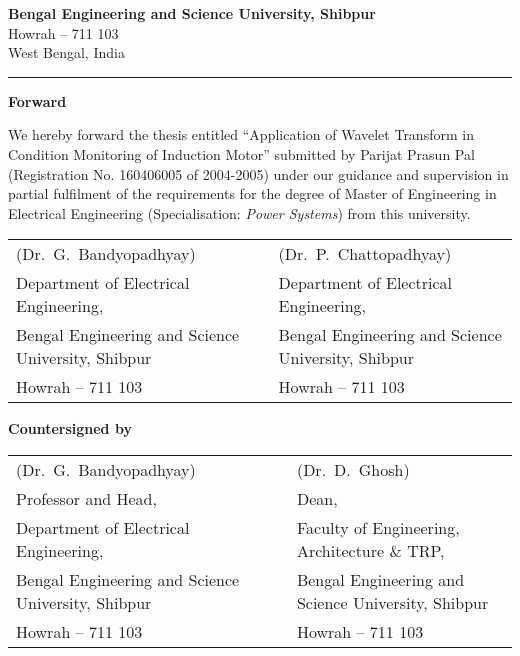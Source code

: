 \documentclass[a4paper,11pt]{report}
\begin{document}

\thispagestyle{empty}
\vspace*{7mm}
\begin{center}
{\Large \textbf{Bengal Engineering and Science University, Shibpur}}\\
\vspace{3.5pt}
{\large Howrah -- 711 103}\\
\vspace{3.5pt}
{\large West Bengal, India}
\end{center}
\hrule

\vspace{25mm}
\begin{center}
{\Large \textbf{Forward}}
\end{center}

\noindent We hereby forward the thesis entitled ``Application of Wavelet Transform in Condition Monitoring of Induction Motor'' submitted by Parijat Prasun Pal (Registration No. 160406005 of 2004-2005) under our guidance and supervision in partial fulfilment of the requirements for the degree of Master of Engineering in Electrical Engineering (Specialisation: \emph{Power Systems}) from this university.

\vspace{25mm}
\begin{flushleft}
\begin{tabular}{@{} lcl @{}}
(Dr.~G.~Bandyopadhyay) & & (Dr.~P.~Chattopadhyay)\\
{\footnotesize Department of Electrical Engineering,} & & {\footnotesize Department of Electrical Engineering,}\\
{\footnotesize Bengal Engineering and Science University, Shibpur} & & {\footnotesize Bengal Engineering and Science University, Shibpur}\\
{\footnotesize Howrah -- 711 103} & & {\footnotesize Howrah -- 711 103}
\end{tabular}

\vspace{20mm}
\noindent \textbf{Countersigned by}

\vspace{25mm}
\begin{tabular}{@{} lcl @{}}
(Dr.~G.~Bandyopadhyay)& & (Dr.~D.~Ghosh)\\
{\footnotesize Professor and Head,}& & {\footnotesize Dean,}\\
{\footnotesize Department of Electrical Engineering,}& &{\footnotesize Faculty of Engineering, Architecture \& TRP,}\\
{\footnotesize Bengal Engineering and Science University, Shibpur}& &{\footnotesize Bengal Engineering and Science University, Shibpur}\\
{\footnotesize Howrah -- 711 103}& &{\footnotesize Howrah -- 711 103}
\end{tabular}
\end{flushleft}
\clearpage
\end{document}
